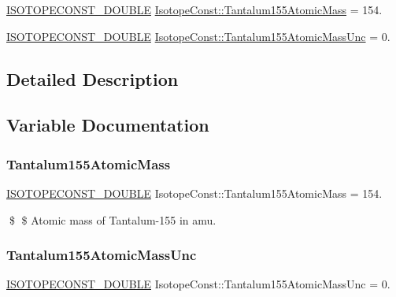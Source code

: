 \begin{DoxyCompactItemize}
\item 
\mbox{\hyperlink{group___isotope_const-_macros_ga8f45a7272ce02c0b4c65c44636ed719a}{I\+S\+O\+T\+O\+P\+E\+C\+O\+N\+S\+T\+\_\+\+D\+O\+U\+B\+LE}} \mbox{\hyperlink{group___isotope_const-_tantalum-_ta155_ga72fbba3c4d4740e6f68b2dcd827786c0}{Isotope\+Const\+::\+Tantalum155\+Atomic\+Mass}} = 154.
\item 
\mbox{\hyperlink{group___isotope_const-_macros_ga8f45a7272ce02c0b4c65c44636ed719a}{I\+S\+O\+T\+O\+P\+E\+C\+O\+N\+S\+T\+\_\+\+D\+O\+U\+B\+LE}} \mbox{\hyperlink{group___isotope_const-_tantalum-_ta155_gac1126c14fd0eb4244eecc2459000570a}{Isotope\+Const\+::\+Tantalum155\+Atomic\+Mass\+Unc}} = 0.
\end{DoxyCompactItemize}


\subsection{Detailed Description}


\subsection{Variable Documentation}
\mbox{\label{group___isotope_const-_tantalum-_ta155_ga72fbba3c4d4740e6f68b2dcd827786c0}} 
\subsubsection{\texorpdfstring{Tantalum155\+Atomic\+Mass}{Tantalum155AtomicMass}}
{\footnotesize\ttfamily \mbox{\hyperlink{group___isotope_const-_macros_ga8f45a7272ce02c0b4c65c44636ed719a}{I\+S\+O\+T\+O\+P\+E\+C\+O\+N\+S\+T\+\_\+\+D\+O\+U\+B\+LE}} Isotope\+Const\+::\+Tantalum155\+Atomic\+Mass = 154.}

\$ \$ Atomic mass of Tantalum-\/155 in amu. \mbox{\label{group___isotope_const-_tantalum-_ta155_gac1126c14fd0eb4244eecc2459000570a}} 
\subsubsection{\texorpdfstring{Tantalum155\+Atomic\+Mass\+Unc}{Tantalum155AtomicMassUnc}}
{\footnotesize\ttfamily \mbox{\hyperlink{group___isotope_const-_macros_ga8f45a7272ce02c0b4c65c44636ed719a}{I\+S\+O\+T\+O\+P\+E\+C\+O\+N\+S\+T\+\_\+\+D\+O\+U\+B\+LE}} Isotope\+Const\+::\+Tantalum155\+Atomic\+Mass\+Unc = 0.}

